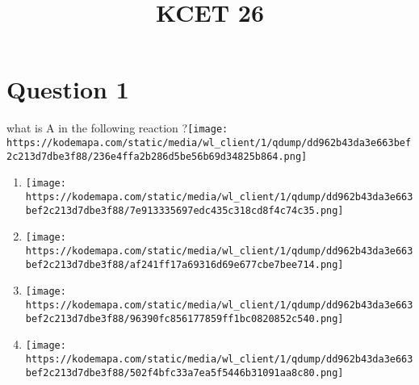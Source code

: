 \documentclass{article}
\title{KCET 26}
\begin{document}
                    \maketitle
                    \section*{Question 1}
what is A in the following reaction ?\texttt{[image: https://kodemapa.com/static/media/wl\_client/1/qdump/dd962b43da3e663bef2c213d7dbe3f88/236e4ffa2b286d5be56b69d34825b864.png]}\newline
\begin{enumerate}[label=(\alph*)]
\item \texttt{[image: https://kodemapa.com/static/media/wl\_client/1/qdump/dd962b43da3e663bef2c213d7dbe3f88/7e913335697edc435c318cd8f4c74c35.png]}
\item \texttt{[image: https://kodemapa.com/static/media/wl\_client/1/qdump/dd962b43da3e663bef2c213d7dbe3f88/af241ff17a69316d69e677cbe7bee714.png]}
\item \texttt{[image: https://kodemapa.com/static/media/wl\_client/1/qdump/dd962b43da3e663bef2c213d7dbe3f88/96390fc856177859ff1bc0820852c540.png]}
\item \texttt{[image: https://kodemapa.com/static/media/wl\_client/1/qdump/dd962b43da3e663bef2c213d7dbe3f88/502f4bfc33a7ea5f5446b31091aa8c80.png]}
\end{enumerate}
\newpage
\end{document}
